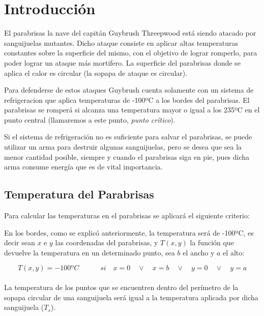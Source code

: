 \documentclass{article}
\begin{document}
\section{Introducción}

El parabrisas la nave del capitán Guybrush Threepwood está siendo atacado por sanguijuelas mutantes. Dicho ataque consiste en aplicar altas temperaturas constantes sobre la superficie del mismo, con el objetivo de lograr romperlo, para poder lograr un ataque más mortifero. La superficie del parabrisas donde se aplica el calor es circular (la sopapa de ataque es circular).

Para defenderse de estos ataques Guybrush cuenta solamente con un sistema de refrigeracion que aplica temperaturas de -100ºC a los bordes del parabrisas. El parabrisas se romperá si alcanza una temperatura mayor o igual a los 235ºC en el punto central (llamaremos a este punto, \textit{punto crítico}).

Si el sistema de refrigeración no es suficiente para salvar el parabrisas, se puede utilizar un arma para destruir algunas sanguijuelas, pero se desea que sea la menor cantidad posible, siempre y cuando el parabrisas siga en pie, pues dicha arma consume energía que es de vital importancia.







\subsection{Temperatura del Parabrisas}

Para calcular las temperaturas en el parabrisas se aplicará el siguiente criterio: 

En los bordes, como se explicó anteriormente, la temperatura será de -100ºC, es decir sean $x$ e $y$ las coordenadas del parabrisas, y $T(x,y)$ la función que devuelve la temperatura en un determinado punto, sea $b$ el ancho y $a$ el alto:

\begin{equation}
T(x,y)=-100ºC 	\quad	\quad	 \quad si \quad x=0 \quad \vee \quad x=b \quad \vee \quad y=0 \quad \vee \quad y=a
\end{equation}\\



La temperatura de los puntos que se encuentren dentro del perímetro de la sopapa circular de una sanguijuela será igual a la temperatura aplicada por dicha sanguijuela ($T_s$).\\
\end{document}
